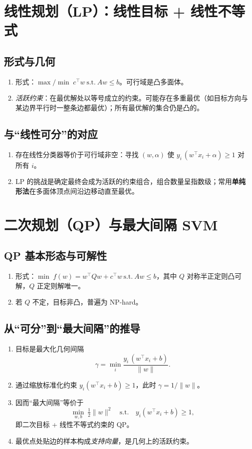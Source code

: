 \documentclass[10.5pt,hyperref,a4paper,UTF8]{ctexart}
\theoremstyle{definition}
\begin{document}
\section{线性规划（LP）：线性目标 + 线性不等式}

\subsection{形式与几何}
\begin{enumerate}
  \item 形式：$\max/\min\; c^\top w\ \text{s.t.}\ Aw\le b$。可行域是凸多面体。
  \item \emph{活跃约束}：在最优解处以等号成立的约束。可能存在多重最优（如目标方向与某边界平行时一整条边都最优）；所有最优解的集合仍是凸的。
\end{enumerate}

\subsection{与“线性可分”的对应}
\begin{enumerate}
  \item 存在线性分类器等价于可行域非空：寻找 $(w,\alpha)$ 使 $y_i\,(w^\top x_i+\alpha)\ge 1$ 对所有 $i$。
  \item LP 的挑战是确定最终会成为活跃的约束组合，组合数量呈指数级；常用\textbf{单纯形法}在多面体顶点间沿边移动直至最优。
\end{enumerate}

\section{二次规划（QP）与最大间隔 SVM}

\subsection{QP 基本形态与可解性}
\begin{enumerate}
  \item 形式：$\min\; f(w)=w^\top Q w + c^\top w\ \text{s.t.}\ Aw\le b$，其中 $Q$ 对称半正定则凸可解，$Q$ 正定则解唯一。
  \item 若 $Q$ 不定，目标非凸，普遍为 NP-hard。
\end{enumerate}

\subsection{从“可分”到“最大间隔”的推导}
\begin{enumerate}
  \item 目标是最大化几何间隔
  \[
  \gamma=\min_i \frac{y_i\,(w^\top x_i+b)}{\lVert w\rVert}.
  \]
  \item 通过缩放标准化约束 $y_i(w^\top x_i+b)\ge 1$，此时 $\gamma=1/\lVert w\rVert$。
  \item 因而“最大间隔”等价于
  \[
  \min_{w,b}\ \tfrac12\lVert w\rVert^2\quad \text{s.t.}\quad y_i(w^\top x_i+b)\ge 1,
  \]
  即二次目标 + 线性不等式约束的 QP。
  \item 最优点处贴边的样本构成\emph{支持向量}，是几何上的活跃约束。
\end{enumerate}
\end{document}

